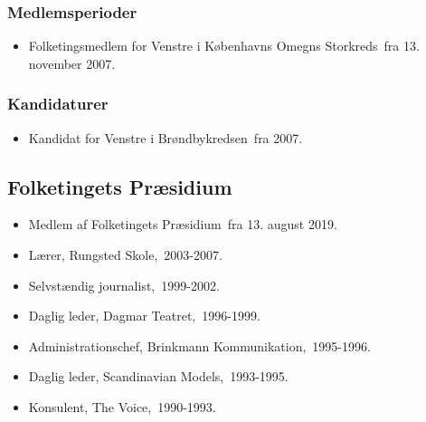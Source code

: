\documentclass[11pt, a4paper]{awesome-cv}
\begin{document}
\begin{cvletter}
\subsubsection*{Medlemsperioder}
\begin{itemize}
\item Folketingsmedlem for Venstre i Københavns Omegns Storkreds fra 13. november 2007.
\end{itemize}
\subsubsection*{Kandidaturer}
\begin{itemize}
\item Kandidat for Venstre i Brøndbykredsen fra 2007.
\end{itemize}
\subsection*{Folketingets Præsidium}
\begin{itemize}
\item Medlem af Folketingets Præsidium fra 13. august 2019.
\end{itemize}
\begin{itemize}
\item Lærer, Rungsted Skole, 2003-2007.
\item Selvstændig journalist, 1999-2002.
\item Daglig leder, Dagmar Teatret, 1996-1999.
\item Administrationschef, Brinkmann Kommunikation, 1995-1996.
\item Daglig leder, Scandinavian Models, 1993-1995.
\item Konsulent, The Voice, 1990-1993.
\end{itemize}
\end{cvletter}
\end{document}
